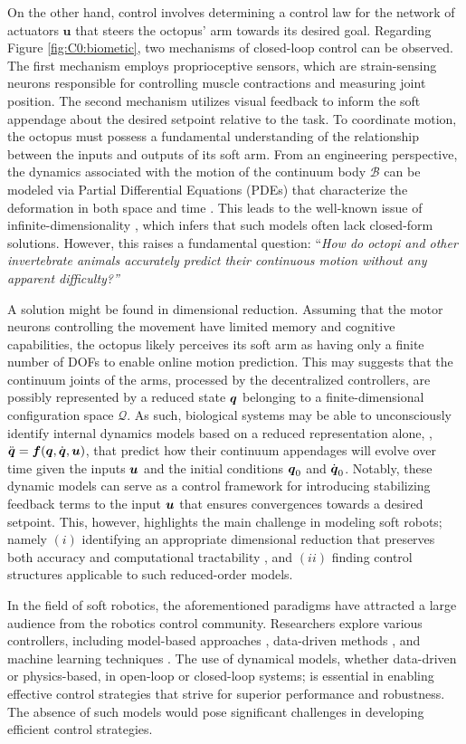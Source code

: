 On the other hand, control involves determining a control law for the network of actuators $\textbf{u}$ that steers the octopus' arm towards its desired goal. Regarding Figure \ref{fig:C0:biometic}, two mechanisms of closed-loop control can be observed. The first mechanism employs proprioceptive sensors, which are strain-sensing neurons responsible for controlling muscle contractions and measuring joint position. The second mechanism utilizes visual feedback to inform the soft appendage about the desired setpoint relative to the task. To coordinate motion, the octopus must possess a fundamental understanding of the relationship between the inputs and outputs of its soft arm. From an engineering perspective, the dynamics associated with the motion of the continuum body $\mathcal{B}$ can be modeled via Partial Differential Equations (PDEs) that characterize the deformation in both space and time \cite{Armanini2023,DellaSantina2021,Rus2015}. This leads to the well-known issue of infinite-dimensionality \cite{DellaSantina2020,Holzapfel2002,Mochiyama1992}, which infers that such models often lack closed-form solutions. However, this raises a fundamental question: ``\emph{How do octopi and other invertebrate animals accurately predict their continuous motion without any apparent difficulty?'' } 

A solution might be found in dimensional reduction. Assuming that the motor neurons controlling the movement have limited memory and cognitive capabilities, the octopus likely perceives its soft arm as having only a finite number of DOFs to enable online motion prediction. This may suggests that the continuum joints of the arms, processed by the decentralized controllers, are possibly represented by a reduced state ${\boldsymbol{q}}$ belonging to a finite-dimensional configuration space $\mathcal{Q}$. As such, biological systems may be able to unconsciously identify internal dynamics models based on a reduced representation alone, \eg, ${\ddot{\boldsymbol{q}}} = {\boldsymbol{f}}({\boldsymbol{q}},{\dot{\boldsymbol{q}}},{\boldsymbol{u}})$, that predict how their continuum appendages will evolve over time given the inputs ${\boldsymbol{u}}$ and the initial conditions ${\boldsymbol{q}}_0$ and ${\dot{\boldsymbol{q}}}_0$. Notably, these dynamic models can serve as a control framework for introducing stabilizing feedback terms to the input ${\boldsymbol{u}}$ that ensures convergences towards a desired setpoint. This, however, highlights the main challenge in modeling soft robots; namely $(i)$ identifying an appropriate dimensional reduction that preserves both accuracy and computational tractability \cite{DellaSantina2021}, and $(ii)$ finding control structures applicable to such reduced-order models.

In the field of soft robotics, the aforementioned paradigms have attracted a large audience from the robotics control community. Researchers explore various controllers, including model-based approaches \cite{Armanini2023,DellaSantina2021,Milana2021,Franco2020}, data-driven methods \cite{Bruder2019,Alora2022}, and machine learning techniques \cite{Thuruthel2017Oct,Thuruthel2018Nov,Kim2021Feb,Schegg2022}. The use of dynamical models, whether data-driven or physics-based, in open-loop or closed-loop systems; is essential in enabling effective control strategies that strive for superior performance and robustness. The absence of such models would pose significant challenges in developing efficient control strategies.
